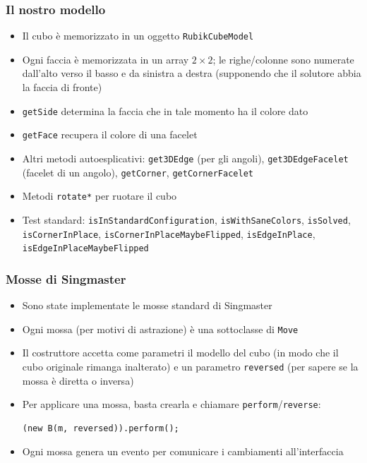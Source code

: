 \documentclass{beamer}
\begin{document}
\begin{frame}
\frametitle{Il nostro modello}
\begin{itemize}
\item Il cubo è memorizzato in un oggetto \texttt{RubikCubeModel}
\item Ogni faccia è memorizzata in un array $2\times 2$; le righe/colonne sono
numerate dall'alto verso il basso e da sinistra a destra (supponendo che il
solutore abbia la faccia di fronte)
\item \texttt{getSide} determina la faccia che in tale momento ha il colore dato
\item \texttt{getFace} recupera il colore di una facelet
\item Altri metodi autoesplicativi: \texttt{get3DEdge} (per gli angoli),
\texttt{get3DEdgeFacelet} (facelet di un angolo), \texttt{getCorner},
\texttt{getCornerFacelet}
\item Metodi \texttt{rotate*} per ruotare il cubo
\item Test standard: \texttt{isInStandardConfiguration},
\texttt{isWithSaneColors}, \texttt{isSolved}, \texttt{isCornerInPlace},
\texttt{isCornerInPlaceMaybeFlipped}, \texttt{isEdgeInPlace},
\texttt{isEdgeInPlaceMaybeFlipped}
\end{itemize}
\end{frame}

\begin{frame}[fragile]
\frametitle{Mosse di Singmaster}
\begin{itemize}
\item Sono state implementate le mosse standard di Singmaster
\item Ogni mossa (per motivi di astrazione) è una sottoclasse di \texttt{Move}
\item Il costruttore accetta come parametri il modello del cubo (in modo che il
cubo originale rimanga inalterato) e un parametro \texttt{reversed} (per sapere
se la mossa è diretta o inversa)
\item Per applicare una mossa, basta crearla e chiamare
\texttt{perform}/\texttt{reverse}:
\begin{center}
\begin{lstlisting}
(new B(m, reversed)).perform();
\end{lstlisting}
\end{center}
\item Ogni mossa genera un evento per comunicare i cambiamenti all'interfaccia
\end{itemize}
\end{frame}
\end{document}
